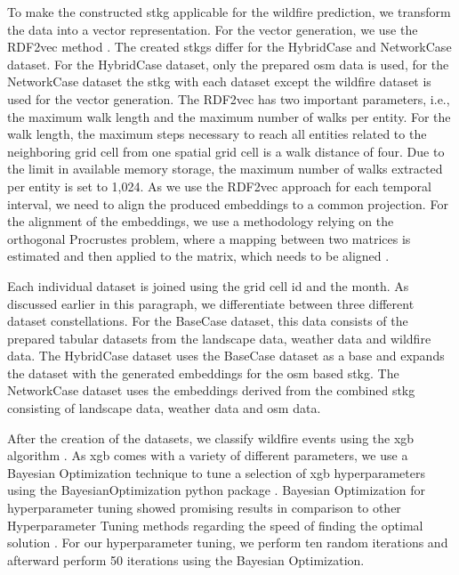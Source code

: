 \documentclass[
]{ceurart}
\begin{document}
To make the constructed \gls*{stkg} applicable for the wildfire prediction, we transform the data into a vector representation. For the vector generation, we use the RDF2vec method \cite{Ristoski.2016}. The created \glspl*{stkg} differ for the HybridCase and NetworkCase dataset. For the HybridCase dataset, only the prepared \gls*{osm} data is used, for the NetworkCase dataset the \gls*{stkg} with each dataset except the wildfire dataset is used for the vector generation. The RDF2vec has two important parameters, i.e., the maximum walk length and the maximum number of walks per entity. For the walk length, the maximum steps necessary to reach all entities related to the neighboring grid cell from one spatial grid cell is a walk distance of four. Due to the limit in available memory storage, the maximum number of walks extracted per entity is set to 1,024. As we use the RDF2vec approach for each temporal interval, we need to align the produced embeddings to a common projection. For the alignment of the embeddings, we use a methodology relying on the orthogonal Procrustes problem, where a mapping between two matrices is estimated and then applied to the matrix, which needs to be aligned \cite{Hamilton.2016}.

Each individual dataset is joined using the grid cell \gls*{id} and the month. As discussed earlier in this paragraph, we differentiate between three different dataset constellations. For the BaseCase dataset, this data consists of the prepared tabular datasets from the landscape data, weather data and wildfire data. The HybridCase dataset uses the BaseCase dataset as a base and expands the dataset with the generated embeddings for the \gls*{osm} based \gls*{stkg}. The NetworkCase dataset uses the embeddings derived from the combined \gls*{stkg} consisting of landscape data, weather data and \gls*{osm} data.

After the creation of the datasets, we classify wildfire events using the \gls*{xgb} algorithm \cite{Chen.2016}. As \gls*{xgb} comes with a variety of different parameters, we use a Bayesian Optimization technique to tune a selection of \gls*{xgb} hyperparameters using the BayesianOptimization python package \cite{Nogueira.2014}. Bayesian Optimization for hyperparameter tuning showed promising results in comparison to other Hyperparameter Tuning methods regarding the speed of finding the optimal solution \cite{Snoek.2012}. For our hyperparameter tuning, we perform ten random iterations and afterward perform 50 iterations using the Bayesian Optimization. %
\end{document}
